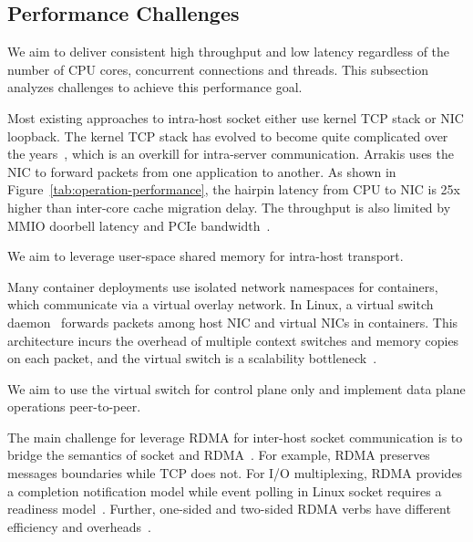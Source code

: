 \subsection{Performance Challenges}
\label{subsec:performance-challenges}

We aim to deliver consistent high throughput and low latency regardless of the number of CPU cores, concurrent connections and threads.
This subsection analyzes challenges to achieve this performance goal.

Most existing approaches to intra-host socket either use kernel TCP stack or NIC loopback.
The kernel TCP stack has evolved to become quite complicated over the years~\cite{yasukata2016stackmap}, which is an overkill 
for intra-server communication. %
Arrakis uses the NIC to forward packets from one application to another.
As shown in Figure~\ref{tab:operation-performance}, the hairpin latency from CPU to NIC is 25x higher than inter-core cache migration delay.
The throughput is also limited by MMIO doorbell latency and PCIe bandwidth~\cite{neugebauer2018understanding,li2017kv}.

We aim to leverage user-space shared memory for intra-host transport.

Many container deployments use isolated network namespaces for containers, which communicate via a virtual overlay network.
In Linux, a virtual switch daemon~\cite{pfaff2015design} forwards packets among host NIC and virtual NICs in containers.
This architecture incurs the overhead of multiple context switches and memory copies on each packet, and the virtual switch is a scalability bottleneck~\cite{pfefferle2015hybrid}.

We aim to use the virtual switch for control plane only and implement data plane operations peer-to-peer.

The main challenge for leverage RDMA for inter-host socket communication is to bridge the semantics of socket and RDMA~\cite{dragojevic2014farm}.
For example, RDMA preserves messages boundaries while TCP does not.
For I/O multiplexing, RDMA provides a completion notification model while event polling in Linux socket requires a readiness model~\cite{han2012megapipe}.
Further, one-sided and two-sided RDMA verbs have different efficiency and overheads~\cite{kalia2014using,kaminsky2016design}.

